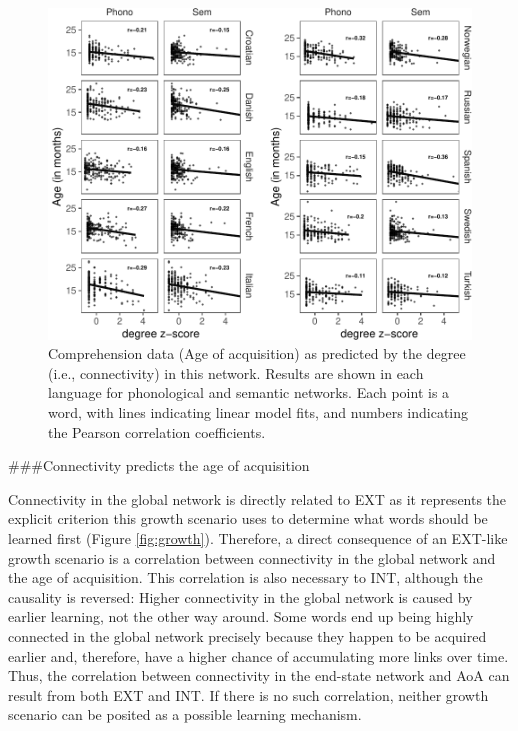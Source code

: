 \documentclass[english,,man,floatsintext]{apa6}
\begin{document}
\begin{figure}[!h]
\includegraphics[width=\textwidth]{ms_files/figure-latex/corrComp-1} \caption{Comprehension data (Age of acquisition) as predicted by the degree (i.e., connectivity) in this network. Results are shown in each language for phonological and semantic networks. Each point is a word, with lines indicating linear model fits, and numbers indicating the Pearson correlation coefficients.}\label{fig:corrComp}
\end{figure}

\#\#\#Connectivity predicts the age of acquisition

Connectivity in the global network is directly related to EXT as it represents the explicit criterion this growth scenario uses to determine what words should be learned first (Figure \ref{fig:growth}). Therefore, a direct consequence of an EXT-like growth scenario is a correlation between connectivity in the global network and the age of acquisition. This correlation is also necessary to INT, although the causality is reversed: Higher connectivity in the global network is caused by earlier learning, not the other way around. Some words end up being highly connected in the global network precisely because they happen to be acquired earlier and, therefore, have a higher chance of accumulating more links over time. Thus, the correlation between connectivity in the end-state network and AoA can result from both EXT and INT. If there is no such correlation, neither growth scenario can be posited as a possible learning mechanism.
\end{document}
